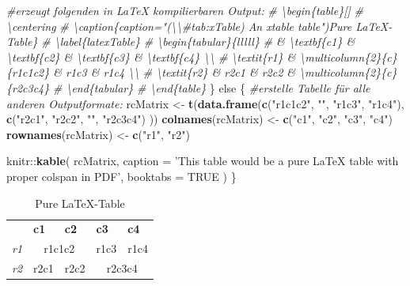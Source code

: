 \documentclass[]{book}
\makeatletter
\newenvironment{Shaded}{\begin{snugshade}}{\end{snugshade}}
\newcommand{\KeywordTok}[1]{\textcolor[rgb]{0.13,0.29,0.53}{\textbf{{#1}}}}
\newcommand{\DataTypeTok}[1]{\textcolor[rgb]{0.13,0.29,0.53}{{#1}}}
\newcommand{\StringTok}[1]{\textcolor[rgb]{0.31,0.60,0.02}{{#1}}}
\newcommand{\CommentTok}[1]{\textcolor[rgb]{0.56,0.35,0.01}{\textit{{#1}}}}
\newcommand{\OtherTok}[1]{\textcolor[rgb]{0.56,0.35,0.01}{{#1}}}
\newcommand{\NormalTok}[1]{{#1}}
\newenvironment{kframe}{%
\medskip{}
\setlength{\fboxsep}{.8em}
 \def\at@end@of@kframe{}%
 \ifinner\ifhmode%
  \def\at@end@of@kframe{\end{minipage}}%
  \begin{minipage}{\columnwidth}%
 \fi\fi%
 \def\FrameCommand##1{\hskip\@totalleftmargin \hskip-\fboxsep
 \colorbox{shadecolor}{##1}\hskip-\fboxsep
     \hskip-\linewidth \hskip-\@totalleftmargin \hskip\columnwidth}%
 \MakeFramed {\advance\hsize-\width
   \@totalleftmargin\z@ \linewidth\hsize
   \@setminipage}}%
 {\par\unskip\endMakeFramed%
 \at@end@of@kframe}
\renewenvironment{Shaded}{\begin{kframe}}{\end{kframe}}
\theoremstyle{definition}
\theoremstyle{definition}
\theoremstyle{remark}
\makeatother
\begin{document}
\begin{Shaded}
\begin{Highlighting}[]
    \CommentTok{#erzeugt folgenden in LaTeX kompilierbaren Output:}
    \CommentTok{# \textbackslash{}begin\{table\}[]}
    \CommentTok{# \textbackslash{}centering}
    \CommentTok{# \textbackslash{}caption\{caption="(\textbackslash{}\textbackslash{}#tab:xTable) An xtable table")Pure LaTeX-Table\}}
    \CommentTok{# \textbackslash{}label\{latexTable\}}
    \CommentTok{# \textbackslash{}begin\{tabular\}\{lllll\}}
    \CommentTok{#             & \textbackslash{}textbf\{c1\}  & \textbackslash{}textbf\{c2\} & \textbackslash{}textbf\{c3\}  & \textbackslash{}textbf\{c4\} \textbackslash{}\textbackslash{}}
    \CommentTok{# \textbackslash{}textit\{r1\} & \textbackslash{}multicolumn\{2\}\{c\}\{r1c1c2\} & r1c3         & r1c4        \textbackslash{}\textbackslash{}}
    \CommentTok{# \textbackslash{}textit\{r2\} & r2c1         & r2c2        & \textbackslash{}multicolumn\{2\}\{c\}\{r2c3c4\}}
    \CommentTok{# \textbackslash{}end\{tabular\}}
    \CommentTok{# \textbackslash{}end\{table\}}
\NormalTok{\} else \{}
  \CommentTok{#erstelle Tabelle für alle anderen Outputformate:}
    \NormalTok{rcMatrix <-}\StringTok{ }\KeywordTok{t}\NormalTok{(}\KeywordTok{data.frame}\NormalTok{(}\KeywordTok{c}\NormalTok{(}\StringTok{"r1c1c2"}\NormalTok{, }\StringTok{""}\NormalTok{, }\StringTok{"r1c3"}\NormalTok{, }\StringTok{"r1c4"}\NormalTok{),}
                             \KeywordTok{c}\NormalTok{(}\StringTok{"r2c1"}\NormalTok{, }\StringTok{"r2c2"}\NormalTok{, }\StringTok{""}\NormalTok{, }\StringTok{"r2c3c4"}\NormalTok{) ))}
      \KeywordTok{colnames}\NormalTok{(rcMatrix) <-}\StringTok{ }\KeywordTok{c}\NormalTok{(}\StringTok{"c1"}\NormalTok{, }\StringTok{"c2"}\NormalTok{, }\StringTok{"c3"}\NormalTok{, }\StringTok{"c4"}\NormalTok{)}
      \KeywordTok{rownames}\NormalTok{(rcMatrix) <-}\StringTok{ }\KeywordTok{c}\NormalTok{(}\StringTok{"r1"}\NormalTok{, }\StringTok{"r2"}\NormalTok{)}
    
    \NormalTok{knitr::}\KeywordTok{kable}\NormalTok{(}
      \NormalTok{rcMatrix, }\DataTypeTok{caption =} \StringTok{'This table would be a pure LaTeX table with proper colspan in PDF'}\NormalTok{,}
      \DataTypeTok{booktabs =} \OtherTok{TRUE}
    \NormalTok{)}
\NormalTok{\}}
\end{Highlighting}
\end{Shaded}

\begin{table}[]
\centering
\caption{\label{tab:latexTable} Pure LaTeX-Table}
\label{latexTable}
\begin{tabular}{lllll}
            & \textbf{c1}  & \textbf{c2} & \textbf{c3}  & \textbf{c4} \\
\textit{r1} & \multicolumn{2}{c}{r1c1c2} & r1c3         & r1c4        \\
\textit{r2} & r2c1         & r2c2        & \multicolumn{2}{c}{r2c3c4}
\end{tabular}
\end{table}
\end{document}
